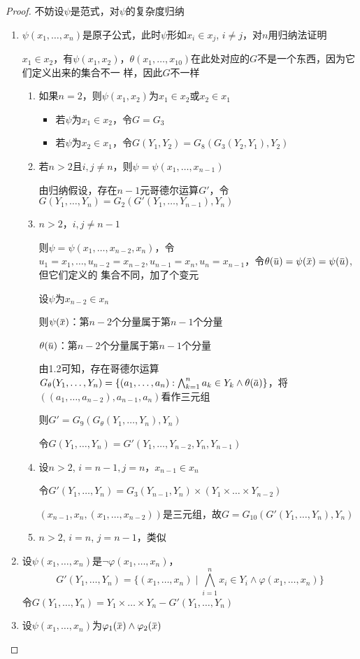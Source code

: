\documentclass[11pt]{article}
\begin{document}
\begin{proof}
不妨设\(\psi\)是范式，对\(\psi\)的复杂度归纳
\begin{enumerate}
\item \(\psi(x_1,\dots,x_n)\)是原子公式，此时\(\psi\)形如\(x_i\in x_j\), \(i\neq j\)，对\(n\)用归纳法证明

\(x_1\in x_2\)，有\(\psi(x_1,x_2)\)，\(\theta(x_1,\dots,x_{10})\)在此处对应的\(G\)不是一个东西，因为它们定义出来的集合不一
样，因此\(G\)不一样
\begin{enumerate}
\item 如果\(n=2\)，则\(\psi(x_1,x_2)\)为\(x_1\in x_2\)或\(x_2\in x_1\)
\begin{itemize}
\item 若\(\psi\)为\(x_1\in x_2\)，令\(G=G_3\)
\item 若\(\psi\)为\(x_2\in x_1\)，令\(G(Y_1,Y_2)=G_8(G_3(Y_2,Y_1),Y_2)\)
\end{itemize}
\item 若\(n>2\)且\(i,j\neq n\)，则\(\psi=\psi(x_1,\dots,x_{n-1})\)

由归纳假设，存在\(n-1\)元哥德尔运算\(G'\)，令\(G(Y_1,\dots,Y_n)=G_2(G'(Y_1,\dots,Y_{n-1}),Y_n)\)
\item \(n>2\)，\(i,j\neq n-1\)

则\(\psi=\psi(x_1,\dots,x_{n-2},x_n)\)，令
\(u_1=x_1,\dots,u_{n-2}=x_{n-2},u_{n-1}=x_n,u_n=x_{n-1}\)，令\(\theta(\baru)=\psi(\barx)=\psi(\baru)\),但它们定义的
集合不同，加了个变元

设\(\psi\)为\(x_{n-2}\in x_n\)

则\(\psi(\barx)\)：第\(n-2\)个分量属于第\(n-1\)个分量

\(\theta(\baru)\)：第\(n-2\)个分量属于第\(n-1\)个分量

由1.2可知，存在哥德尔运算\(G_\theta(Y_1,\dots,Y_n)=\{(a_1,\dots,a_n):\bigwedge_{k=1}^na_k\in Y_k\wedge\theta(\bara)\}\)，将
\(((a_1,\dots,a_{n-2}),a_{n-1},a_n)\)看作三元组

则\(G'=G_9(G_{\theta}(Y_1,\dots,Y_n),Y_n)\)

令\(G(Y_1,\dots,Y_n)=G'(Y_1,\dots,Y_{n-2},Y_n,Y_{n-1})\)
\item 设\(n>2\), \(i=n-1,j=n\)，\(x_{n-1}\in x_n\)

令\(G'(Y_1,\dots,Y_n)=G_3(Y_{n-1},Y_n)\times(Y_1\times\dots\times Y_{n-2})\)

\((x_{n-1},x_n,(x_1,\dots,x_{n-2}))\)是三元组，故\(G=G_{10}(G'(Y_1,\dots,Y_n),Y_n)\)
\item \(n>2\), \(i=n\), \(j=n-1\)，类似
\end{enumerate}
\item 设\(\psi(x_1,\dots,x_n)\)是\(\neg\varphi(x_1,\dots,x_n)\)，
\begin{equation*}
G'(Y_1,\dots,Y_n)=\{(x_1,\dots,x_n)\mid\bigwedge_{i=1}^nx_i\in Y_i\wedge\varphi(x_1,\dots,x_n)\}
\end{equation*}
令\(G(Y_1,\dots,Y_n)=Y_1\times\dots\times Y_n-G'(Y_1,\dots,Y_n)\)
\item 设\(\psi(x_1,\dots,x_n)\)为\(\varphi_1(\barx)\wedge\varphi_2(\barx)\)


\end{enumerate}
\end{proof}
\end{document}
